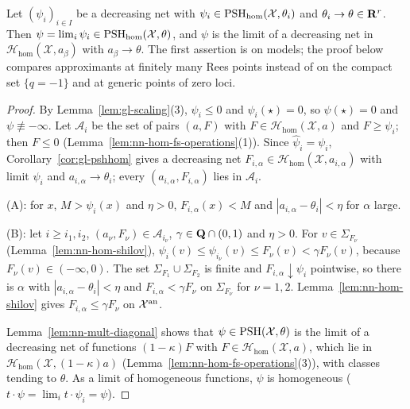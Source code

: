 \begin{theorem}\label{thm:nn-psh2-hom}
\leanok
{}
Let $(\psi_i)_{i\in I}$ be a decreasing net with $\psi_i\in\operatorname{PSH}_{\mathrm{hom}}(\mathcal X,\theta_i)$ and $\theta_i\to\theta\in\mathbf{R}^r$. Then
$\psi=\lim_i\psi_i\in\operatorname{PSH}_{\mathrm{hom}}(\mathcal X,\theta)$, and $\psi$ is the limit of a decreasing net in $\mathcal H_{\mathrm{hom}}(\mathcal X,a_\beta)$ with
$a_\beta\to\theta$. The first assertion is \cite[Lemma~2.3]{FHX} on models; the proof below compares approximants at finitely many
Rees points instead of on the compact set $\{q=-1\}$ and at generic points of zero loci.
\end{theorem}

\begin{proof}
By Lemma~\ref{lem:gl-scaling}(3), $\psi_i\le0$ and $\psi_i(\star)=0$, so $\psi(\star)=0$ and $\psi\not\equiv-\infty$. Let $\mathcal A_i$ be the set of pairs $(a,F)$
with $F\in\mathcal H_{\mathrm{hom}}(\mathcal X,a)$ and $F\ge\psi_i$; then $F\le0$ (Lemma~\ref{lem:nn-hom-fs-operations}(1)). Since $\hat\psi_i=\psi_i$,
Corollary~\ref{cor:gl-pshhom} gives a decreasing net $F_{i,\alpha}\in\mathcal H_{\mathrm{hom}}(\mathcal X,a_{i,\alpha})$ with limit $\psi_i$ and $a_{i,\alpha}\to\theta_i$;
every $(a_{i,\alpha},F_{i,\alpha})$ lies in $\mathcal A_i$.

(A): for $x$, $M>\psi_i(x)$ and $\eta>0$, $F_{i,\alpha}(x)<M$ and $|a_{i,\alpha}-\theta_i|<\eta$ for $\alpha$ large.

(B): let $i\ge i_1,i_2$, $(a_\nu,F_\nu)\in\mathcal A_{i_\nu}$, $\gamma\in\mathbf{Q}\cap(0,1)$ and $\eta>0$. For $v\in\Sigma_{F_\nu}$ (Lemma~\ref{lem:nn-hom-shilov}),
$\psi_i(v)\le\psi_{i_\nu}(v)\le F_\nu(v)<\gamma F_\nu(v)$, because $F_\nu(v)\in(-\infty,0)$. The set $\Sigma_{F_1}\cup\Sigma_{F_2}$ is finite and
$F_{i,\alpha}\downarrow\psi_i$ pointwise, so there is $\alpha$ with $|a_{i,\alpha}-\theta_i|<\eta$ and $F_{i,\alpha}<\gamma F_\nu$ on $\Sigma_{F_\nu}$ for $\nu=1,2$.
Lemma~\ref{lem:nn-hom-shilov} gives $F_{i,\alpha}\le\gamma F_\nu$ on $\mathcal X^{\mathrm{an}}$.

Lemma~\ref{lem:nn-mult-diagonal} shows that $\psi\in\operatorname{PSH}(\mathcal X,\theta)$ is the limit of a decreasing net of functions $(1-\kappa)F$ with
$F\in\mathcal H_{\mathrm{hom}}(\mathcal X,a)$, which lie in $\mathcal H_{\mathrm{hom}}(\mathcal X,(1-\kappa)a)$ (Lemma~\ref{lem:nn-hom-fs-operations}(3)), with classes
tending to $\theta$. As a limit of homogeneous functions, $\psi$ is homogeneous ($t\cdot\psi=\lim_it\cdot\psi_i=\psi$).
\end{proof}

